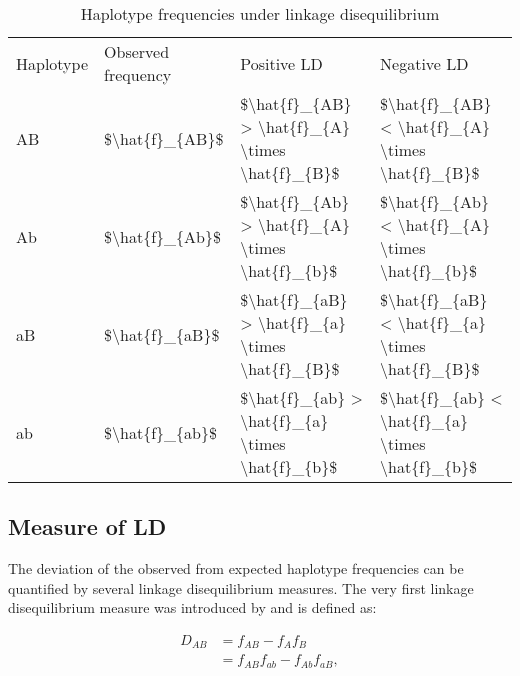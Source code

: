 \documentclass[]{book}
\begin{document}
\begin{table}

\caption{\label{tab:LD}Haplotype frequencies under linkage disequilibrium}
\centering
\begin{tabular}[t]{llll}
\toprule
Haplotype & Observed  frequency & Positive LD & Negative LD\\
AB & \$\textbackslash{}hat\{f\}\_\{AB\}\$ & \$\textbackslash{}hat\{f\}\_\{AB\} > \textbackslash{}hat\{f\}\_\{A\} \textbackslash{}times \textbackslash{}hat\{f\}\_\{B\}\$ & \$\textbackslash{}hat\{f\}\_\{AB\} < \textbackslash{}hat\{f\}\_\{A\} \textbackslash{}times \textbackslash{}hat\{f\}\_\{B\}\$\\
Ab & \$\textbackslash{}hat\{f\}\_\{Ab\}\$ & \$\textbackslash{}hat\{f\}\_\{Ab\} > \textbackslash{}hat\{f\}\_\{A\} \textbackslash{}times \textbackslash{}hat\{f\}\_\{b\}\$ & \$\textbackslash{}hat\{f\}\_\{Ab\} < \textbackslash{}hat\{f\}\_\{A\} \textbackslash{}times \textbackslash{}hat\{f\}\_\{b\}\$\\
aB & \$\textbackslash{}hat\{f\}\_\{aB\}\$ & \$\textbackslash{}hat\{f\}\_\{aB\} > \textbackslash{}hat\{f\}\_\{a\} \textbackslash{}times \textbackslash{}hat\{f\}\_\{B\}\$ & \$\textbackslash{}hat\{f\}\_\{aB\} < \textbackslash{}hat\{f\}\_\{a\} \textbackslash{}times \textbackslash{}hat\{f\}\_\{B\}\$\\
ab & \$\textbackslash{}hat\{f\}\_\{ab\}\$ & \$\textbackslash{}hat\{f\}\_\{ab\} > \textbackslash{}hat\{f\}\_\{a\} \textbackslash{}times \textbackslash{}hat\{f\}\_\{b\}\$ & \$\textbackslash{}hat\{f\}\_\{ab\} < \textbackslash{}hat\{f\}\_\{a\} \textbackslash{}times \textbackslash{}hat\{f\}\_\{b\}\$\\
\bottomrule
\end{tabular}
\end{table}

\hypertarget{measure-of-ld}{%
\subsection{Measure of LD}\label{measure-of-ld}}

The deviation of the observed from expected haplotype frequencies can be
quantified by several linkage disequilibrium measures. The very first
linkage disequilibrium measure was introduced by
\citep{robbins_1918_breeding} and is defined as:

\begin{equation}
\begin{split}
D_{AB} & = f_{AB} - f_{A}f_{B}\\
& = f_{AB}f_{ab} - f_{Ab}f_{aB},    
\end{split}
\label{eq:1}
\end{equation}
\end{document}
